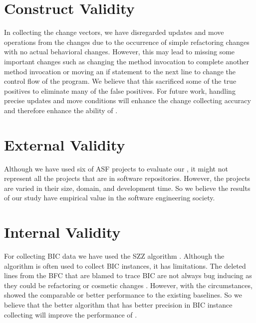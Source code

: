 \section{Construct Validity}
In collecting the change vectors, we have disregarded updates and move operations from the changes due to the occurrence of simple refactoring changes with no actual behavioral changes.
However, this may lead to missing some important changes such as changing the method invocation to complete another method invocation or moving an if statement to the next line to change the control flow of the program.
We believe that this sacrificed some of the true positives to eliminate many of the false positives.
For future work, handling precise updates and move conditions will enhance the change collecting accuracy and therefore enhance the ability of {\simfinmo}.

\section{External Validity}
Although we have used six of ASF projects to evaluate our {\simfinmo}, it might not represent all the projects that are in software repositories.
However, the projects are varied in their size, domain, and development time.
So we believe the results of our study have empirical value in the software engineering society.

\section{Internal Validity}
For collecting BIC data we have used the SZZ algorithm \cite{sliwerski2005changes}.
Although the algorithm is often used to collect BIC instances, it has limitations.
The deleted lines from the BFC that are blamed to trace BIC are not always bug inducing as they could be refactoring or cosmetic changes \cite{neto2018impact}.
However, with the circumstances, {\simfinmo} showed the comparable or better performance to the existing baselines.
So we believe that the better algorithm that has better precision in BIC instance collecting will improve the performance of {\simfinmo}.
